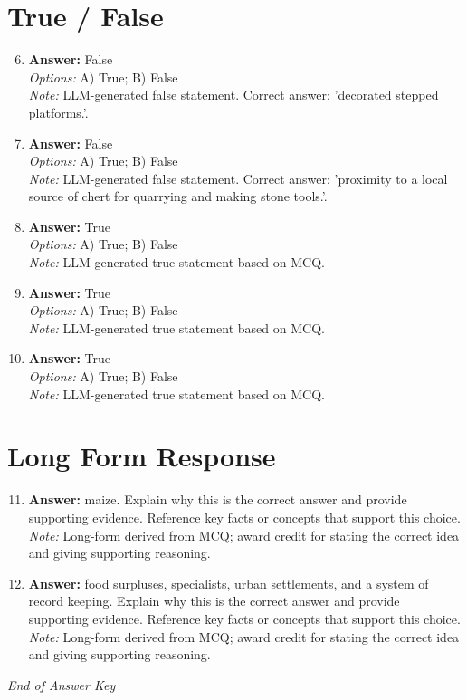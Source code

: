 \documentclass[12pt]{article}
\begin{document}
\section*{True / False}
\begin{enumerate}[label=\arabic*.]
\setcounter{enumi}{5}
\item \textbf{Answer:} False
\\ \textit{Options:} A) True; B) False
\\ \textit{Note:} LLM-generated false statement. Correct answer: 'decorated stepped platforms.'.
\item \textbf{Answer:} False
\\ \textit{Options:} A) True; B) False
\\ \textit{Note:} LLM-generated false statement. Correct answer: 'proximity to a local source of chert for quarrying and making stone tools.'.
\item \textbf{Answer:} True
\\ \textit{Options:} A) True; B) False
\\ \textit{Note:} LLM-generated true statement based on MCQ.
\item \textbf{Answer:} True
\\ \textit{Options:} A) True; B) False
\\ \textit{Note:} LLM-generated true statement based on MCQ.
\item \textbf{Answer:} True
\\ \textit{Options:} A) True; B) False
\\ \textit{Note:} LLM-generated true statement based on MCQ.
\end{enumerate}

\section*{Long Form Response}
\begin{enumerate}[label=\arabic*.]
\setcounter{enumi}{10}
\item \textbf{Answer:} maize. Explain why this is the correct answer and provide supporting evidence. Reference key facts or concepts that support this choice.
\\ \textit{Note:} Long-form derived from MCQ; award credit for stating the correct idea and giving supporting reasoning.
\item \textbf{Answer:} food surpluses, specialists, urban settlements, and a system of record keeping. Explain why this is the correct answer and provide supporting evidence. Reference key facts or concepts that support this choice.
\\ \textit{Note:} Long-form derived from MCQ; award credit for stating the correct idea and giving supporting reasoning.
\end{enumerate}

\vfill
\noindent\textit{End of Answer Key}
\end{document}
